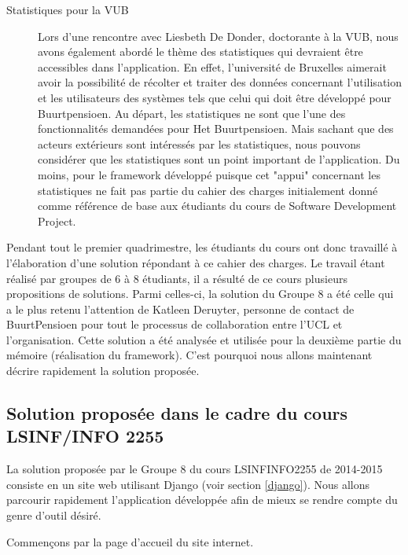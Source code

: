 \begin{description}
\item [Statistiques pour la VUB]
Lors d'une rencontre avec Liesbeth De Donder,  doctorante à la VUB,  nous avons également abordé le thème des statistiques qui devraient être accessibles dans l'application.  En effet,  l'université de Bruxelles aimerait avoir la possibilité de récolter et traiter des données concernant l'utilisation et les utilisateurs des systèmes tels que celui qui doit être développé pour Buurtpensioen.  Au départ,  les statistiques ne sont que l'une des fonctionnalités demandées pour Het Buurtpensioen.  Mais sachant que des acteurs extérieurs sont intéressés par les statistiques,  nous pouvons considérer que les statistiques sont un point important de l'application.  Du moins,  pour le framework développé puisque cet "appui" concernant les statistiques ne fait pas partie du cahier des charges initialement donné comme référence de base aux étudiants du cours de Software Development Project.   

\end{description}

Pendant tout le premier quadrimestre,  les étudiants du cours ont donc travaillé à l'élaboration d'une solution répondant à ce cahier des charges.  Le travail étant réalisé par groupes de 6 à 8 étudiants,  il a résulté de ce cours plusieurs propositions de solutions.  Parmi celles-ci,  la solution du Groupe 8 a été celle qui a le plus retenu l'attention de Katleen Deruyter,  personne de contact de BuurtPensioen pour tout le processus de collaboration entre l'UCL et l'organisation.  Cette solution a été analysée et utilisée pour la deuxième partie du mémoire (réalisation du framework).  C'est pourquoi nous allons maintenant décrire rapidement la solution proposée.


\subsection{Solution proposée dans le cadre du cours LSINF/INFO 2255}

La solution proposée par le Groupe 8 du cours LSINFINFO2255 de 2014-2015 consiste en un site web utilisant Django (voir section \ref{django}).  Nous allons parcourir rapidement l'application développée afin de mieux se rendre compte du genre d'outil désiré.

Commençons par la page d'accueil du site internet.  

\vspace{1cm}
\vspace{1cm}

